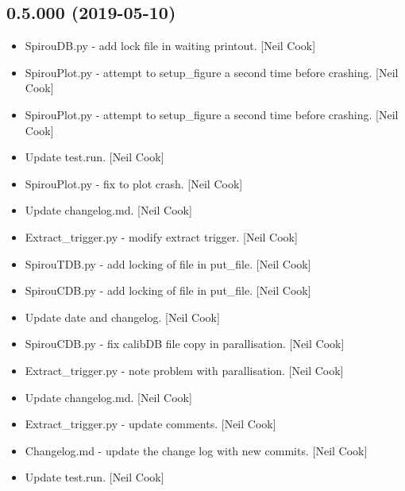 \documentclass[a4paper,10pt,english]{report}
\begin{document}
\subsection{0.5.000 (2019-05-10)}
\label{\detokenize{misc/changelog:id135}}\begin{itemize}
\item {} 
SpirouDB.py - add lock file in waiting printout. {[}Neil Cook{]}

\item {} 
SpirouPlot.py - attempt to setup\_figure a second time before crashing.
{[}Neil Cook{]}

\item {} 
SpirouPlot.py - attempt to setup\_figure a second time before crashing.
{[}Neil Cook{]}

\item {} 
Update test.run. {[}Neil Cook{]}

\item {} 
SpirouPlot.py - fix to plot crash. {[}Neil Cook{]}

\item {} 
Update changelog.md. {[}Neil Cook{]}

\item {} 
Extract\_trigger.py - modify extract trigger. {[}Neil Cook{]}

\item {} 
SpirouTDB.py - add locking of file in put\_file. {[}Neil Cook{]}

\item {} 
SpirouCDB.py - add locking of file in put\_file. {[}Neil Cook{]}

\item {} 
Update date and changelog. {[}Neil Cook{]}

\item {} 
SpirouCDB.py - fix calibDB file copy in parallisation. {[}Neil Cook{]}

\item {} 
Extract\_trigger.py - note problem with parallisation. {[}Neil Cook{]}

\item {} 
Update changelog.md. {[}Neil Cook{]}

\item {} 
Extract\_trigger.py - update comments. {[}Neil Cook{]}

\item {} 
Changelog.md - update the change log with new commits. {[}Neil Cook{]}

\item {} 
Update test.run. {[}Neil Cook{]}


\end{itemize}
\end{document}
